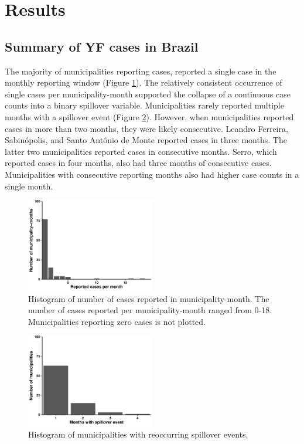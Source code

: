 \documentclass{article}
\begin{document}
\newpage
\section{Results}

\subsection{Summary of YF cases in Brazil}

The majority of municipalities reporting cases, reported a single case in the monthly reporting window (Figure \ref{fig:caseCounts}). The relatively consistent occurrence of single cases per municipality-month supported the collapse of a continuous case counts into a binary spillover variable. Municipalities rarely reported multiple months with a spillover event (Figure \ref{fig:multipleSpills}). However, when municipalities reported cases in more than two months, they were likely consecutive.  Leandro Ferreira, Sabin\'{o}polis, and Santo Ant\^{o}nio de Monte reported cases in three months. The latter two municipalities reported cases in consecutive months. Serro, which reported cases in four months, also had three months of consecutive cases. Municipalities with consecutive reporting months also had higher case counts in a single month.

\begin{figure} [h]
\centering
\includegraphics[width=0.5\textwidth]{Hist_Reported_Cases}
\caption{Histogram of number of cases reported in municipality-month. The number of cases reported per municipality-month ranged from 0-18. Municipalities reporting zero cases is not plotted. }
\label{fig:caseCounts}
\end{figure}


\begin{figure} [h]
\centering
\includegraphics[width=0.5\textwidth]{Hist_Repeated_Spillover}
\caption{Histogram of municipalities with reoccurring spillover events.}
\label{fig:multipleSpills}
\end{figure}
\end{document}
